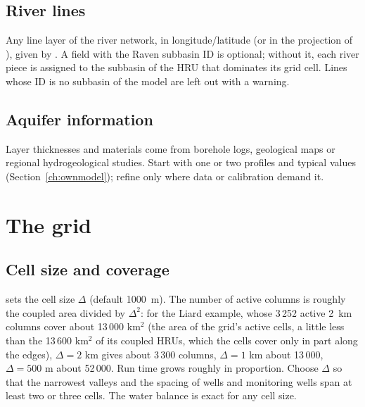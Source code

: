 \subsection{River lines}
Any line layer of the river network, in longitude/latitude (or in the projection of ), given by
. A field with the Raven subbasin ID is optional; without it, each river piece is assigned to the
subbasin of the HRU that dominates its grid cell. Lines whose ID is no subbasin of the model are left out with a warning.

\subsection{Aquifer information}
Layer thicknesses and materials come from borehole logs, geological maps or regional hydrogeological studies. Start with
one or two profiles and typical values (Section~\ref{ch:ownmodel}); refine only where data or calibration demand it.

\section{The grid}\label{sec:ugrids}
\subsection{Cell size and coverage}
 sets the cell size $\Delta$ (default 1000~m). The number of active columns is roughly the coupled area
divided by $\Delta^2$: for the Liard example, whose 3\,252 active 2~km columns cover about 13\,000 km$^2$ (the area of the grid's
active cells, a little less than the 13\,600 km$^2$ of its coupled HRUs, which the cells cover only in part along the edges), $\Delta=2$ km gives about 3\,300 columns, $\Delta=1$ km
about 13\,000, $\Delta=500$ m about 52\,000. Run time grows roughly in proportion. Choose $\Delta$ so that the narrowest
valleys and the spacing of wells and monitoring wells span at least two or three cells. The water balance is exact for
any cell size.


